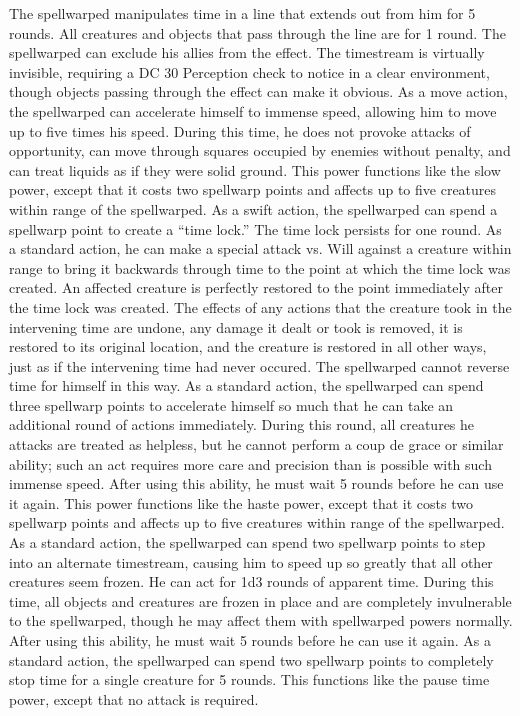 The spellwarped manipulates time in a \arealarge line that extends out from him for 5 rounds. All creatures and objects that pass through the line are \slowed for 1 round. The spellwarped can exclude his allies from the effect. The timestream is virtually invisible, requiring a DC 30 Perception check to notice in a clear environment, though objects passing through the effect can make it obvious.
 As a move action, the spellwarped can accelerate himself to immense speed, allowing him to move up to five times his speed. During this time, he does not provoke attacks of opportunity, can move through squares occupied by enemies without penalty, and can treat liquids as if they were solid ground.
 This power functions like the slow power, except that it costs two spellwarp points and affects up to five creatures within \rngclose range of the spellwarped.
 As a swift action, the spellwarped can spend a spellwarp point to create a ``time lock.'' The time lock persists for one round. As a standard action, he can make a special attack vs. Will against a creature within \rngmed range to bring it backwards through time to the point at which the time lock was created. An affected creature is perfectly restored to the point immediately after the time lock was created. The effects of any actions that the creature took in the intervening time are undone, any damage it dealt or took is removed, it is restored to its original location, and the creature is restored in all other ways, just as if the intervening time had never occured. The spellwarped cannot reverse time for himself in this way.
 As a standard action, the spellwarped can spend three spellwarp points to accelerate himself so much that he can take an additional round of actions immediately. During this round, all creatures he attacks are treated as helpless, but he cannot perform a coup de grace or similar ability; such an act requires more care and precision than is possible with such immense speed. After using this ability, he must wait 5 rounds before he can use it again.
 This power functions like the haste power, except that it costs two spellwarp points and affects up to five creatures within \rngclose range of the spellwarped.
 As a standard action, the spellwarped can spend two spellwarp points to step into an alternate timestream, causing him to speed up so greatly that all other creatures seem frozen. He can act for 1d3 rounds of apparent time. During this time, all objects and creatures are frozen in place and are completely invulnerable to the spellwarped, though he may affect them with spellwarped powers normally. After using this ability, he must wait 5 rounds before he can use it again.
 As a standard action, the spellwarped can spend two spellwarp points to completely stop time for a single creature for 5 rounds. This functions like the pause time power, except that no attack is required.

